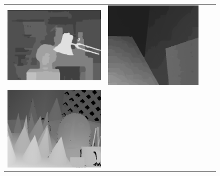 \documentclass{article}
\begin{document}
\begin{figure}[h]
\begin{center}
\begin{tabular}{cccc}
\includegraphics[scale=0.298]{Images/theorical_results/tsukuba.png} &
\includegraphics[scale=0.225]{Images/theorical_results/venus.png}\\
\includegraphics[scale=0.23]{Images/cones_disp.png} &

\end{tabular}
\end{center}
\end{figure}
\end{document}
